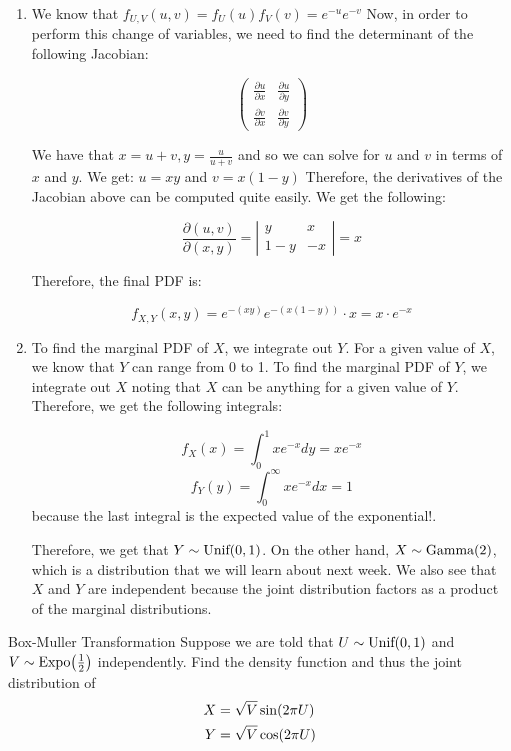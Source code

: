 \documentclass[11.5pt]{article}
\begin{document}
\begin{solution}{4}
\begin{enumerate}
\item We know that $f_{U, V}(u,v) = f_{U}(u) f_{V}(v) = e^{-u}e^{-v}$ Now, in order to perform this change of variables, we need to find the determinant of the following Jacobian: 

$$ \left( \begin{array}{cc}
\frac{\partial u}{\partial x} & \frac{\partial u}{\partial y} \\ \frac{\partial v}{\partial x} & \frac{\partial v}{\partial y}
\end{array} \right)$$

We have that $x = u + v, y = \frac{u}{u+v}$ and so we can solve for $u$ and $v$ in terms of $x$ and $y$. We get: $u = xy$ and $v = x(1-y)$ Therefore, the derivatives of the Jacobian above can be computed quite easily. We get the following: 

$$ \frac{\partial(u,v)}{\partial(x,y)} = \left| \begin{array}{cc}
 y &x  \\
 1-y&-x 
\end{array}  \right|= x$$

Therefore, the final PDF is: 

$$ f_{X, Y}(x,y) = e^{-(xy)} e^{-(x(1-y))} \cdot x = x \cdot e^{-x}$$

\item To find the marginal PDF of $X$, we integrate out $Y$. For a given value of $X$, we know that $Y$ can range from 0 to 1. To find the marginal PDF of $Y$, we integrate out $X$ noting that $X$ can be anything for a given value of $Y$. Therefore, we get the following integrals: 

$$f_X(x) =  \int_0^{1} xe^{-x} dy = xe^{-x}$$ 
$$f_Y(y) = \int_{0}^{\infty} xe^{-x} dx = 1$$ because the last integral is the expected value of the exponential!. 

Therefore, we get that $Y \sim \textrm{Unif}(0,1)$. On the other hand, $X \sim \textrm{Gamma}(2)$, which is a distribution that we will learn about next week. We also see that $X$ and $Y$ are independent because the joint distribution factors as a product of the marginal distributions.
\end{enumerate}
\end{solution}



\begin{exercise}{Box-Muller Transformation}
Suppose we are told that $U \sim \Unif\paren{0, 1}$ and $V \sim \Expo\paren{\frac{1}{2}}$ independently. Find the density function and thus the joint distribution of
\begin{align*}
X &= \sqrt{V} \sin\paren{2 \pi U} \\
Y &= \sqrt{V} \cos\paren{2 \pi U}
\end{align*}
\end{exercise}
\end{document}
